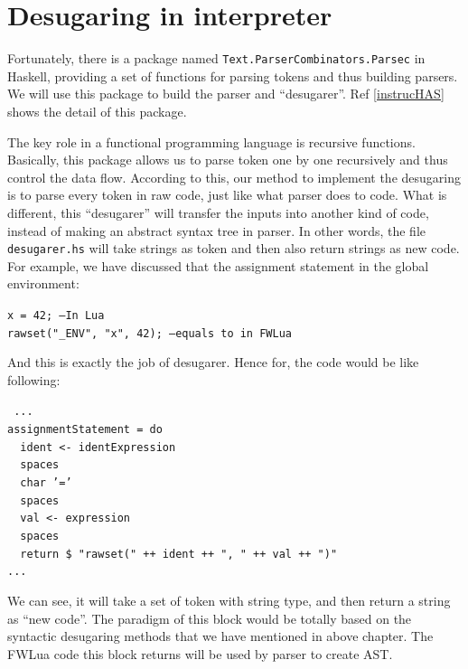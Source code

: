 \section{Desugaring in interpreter}
Fortunately, there is a package named {\tt Text.ParserCombinators.Parsec} in Haskell, providing a set of functions for parsing tokens and thus building parsers. We will use this package to build the parser and ``desugarer''. Ref \ref{instrucHAS} shows the detail of this package.

The key role in a functional programming language is recursive functions. Basically, this package allows us to parse token one by one recursively and thus control the data flow. According to this, our method to implement the desugaring is to parse every token in raw code, just like what parser does to code. What is different, this ``desugarer'' will transfer the inputs into another kind of code, instead of making an abstract syntax tree in parser. In other words, the file {\tt desugarer.hs} will take strings as token and then also return strings as new code. For example, we have discussed that the assignment statement in the global environment:
\begin{flushleft}
{\tt x = 42; --In Lua\\
rawset("\_ENV", "x", 42); --equals to in FWLua\\
}
\end{flushleft}
And this is exactly the job of desugarer. Hence for, the code would be like following:
\begin{flushleft}
{\tt 
...\\
assignmentStatement = do\\
~~ident <- identExpression\\
~~spaces\\
~~char '='\\
~~spaces\\
~~val <- expression\\
~~spaces\\
~~return \$ "rawset(" ++ ident ++ ", " ++ val ++ ")"\\
...\\
}
\end{flushleft}

We can see, it will take a set of token with string type, and then return a string as ``new code''. The paradigm of this block would be totally based on the syntactic desugaring methods that we have mentioned in above chapter. The FWLua code this block returns will be used by parser to create AST.

